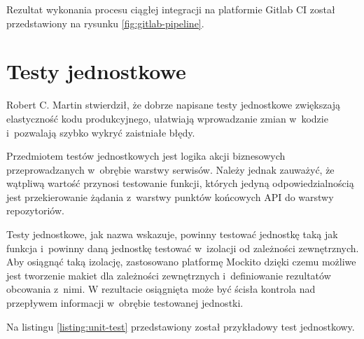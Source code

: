 \par
Rezultat wykonania procesu ciągłej integracji na platformie Gitlab CI został przedstawiony na rysunku \ref{fig:gitlab-pipeline}.


\section{Testy jednostkowe}

Robert C. Martin stwierdził, że dobrze napisane testy jednostkowe zwiększają elastyczność kodu produkcyjnego,
ułatwiają wprowadzanie zmian w~kodzie i~pozwalają szybko wykryć zaistniałe błędy\cite{book:czysty-kod}.

\par
Przedmiotem testów jednostkowych jest logika akcji biznesowych przeprowadzanych w~obrębie warstwy serwisów.
Należy jednak zauważyć, że wątpliwą wartość przynosi testowanie funkcji,
których jedyną odpowiedzialnością jest przekierowanie żądania z~warstwy punktów końcowych API do warstwy repozytoriów.

\par
Testy jednostkowe, jak nazwa wskazuje, powinny testować jednostkę taką jak funkcja i~powinny daną jednostkę testować w~izolacji od zależności zewnętrznych\cite{book:testy-jednostkowe}.
Aby osiągnąć taką izolację, zastosowano platformę Mockito dzięki czemu możliwe jest tworzenie makiet dla zależności zewnętrznych i~definiowanie rezultatów obcowania z~nimi.
W rezultacie osiągnięta może być ścisła kontrola nad przepływem informacji w~obrębie testowanej jednostki.

\par
Na listingu \ref{listing:unit-test} przedstawiony został przykładowy test jednostkowy.

